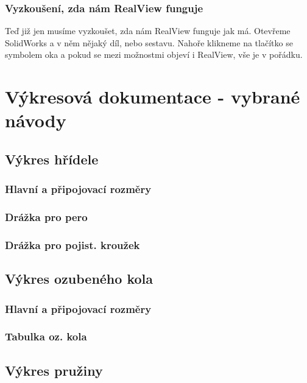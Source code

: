 \subsection*{Vyzkoušení, zda nám RealView funguje}
Teď již jen musíme vyzkoušet, zda nám RealView funguje jak má.
Otevřeme SolidWorks a v něm nějaký díl, nebo sestavu.
Nahoře klikneme na tlačítko se symbolem oka a pokud se mezi možnostmi objeví i RealView, vše je v pořádku. 

\newpage

\chapter{Výkresová dokumentace - vybrané návody}
\fxnote[author=PŠ]{\textcolor{mygreen}{Sekci dopíšu, jakmile začnu točit videa z výkresovky}}

\section{Výkres hřídele}

\subsection{Hlavní a připojovací rozměry}

\subsection{Drážka pro pero}

\subsection{Drážka pro pojist. kroužek}

\section{Výkres ozubeného kola}

\subsection{Hlavní a připojovací rozměry}

\subsection{Tabulka oz. kola}

\section{Výkres pružiny}

